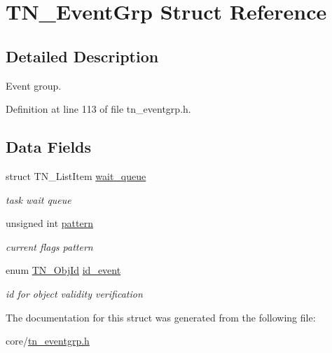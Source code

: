 \hypertarget{structTN__EventGrp}{\section{T\+N\+\_\+\+Event\+Grp Struct Reference}
\label{structTN__EventGrp}
}


\subsection{Detailed Description}
Event group. 

Definition at line 113 of file tn\+\_\+eventgrp.\+h.

\subsection*{Data Fields}
\begin{DoxyCompactItemize}
\item 
\hypertarget{structTN__EventGrp_a93da04331cafe905f9c8b2fa2bad648b}{struct T\+N\+\_\+\+List\+Item \hyperlink{structTN__EventGrp_a93da04331cafe905f9c8b2fa2bad648b}{wait\+\_\+queue}}\label{structTN__EventGrp_a93da04331cafe905f9c8b2fa2bad648b}

\begin{DoxyCompactList}\small\item\em task wait queue \end{DoxyCompactList}\item 
\hypertarget{structTN__EventGrp_a8e287bc47983e2173a5d2696f69b6f2c}{unsigned int \hyperlink{structTN__EventGrp_a8e287bc47983e2173a5d2696f69b6f2c}{pattern}}\label{structTN__EventGrp_a8e287bc47983e2173a5d2696f69b6f2c}

\begin{DoxyCompactList}\small\item\em current flags pattern \end{DoxyCompactList}\item 
\hypertarget{structTN__EventGrp_a0bdf55b6117237122efeefcdf6802d37}{enum \hyperlink{tn__common_8h_ae779dd1f6735f6e139fb70acd004d976}{T\+N\+\_\+\+Obj\+Id} \hyperlink{structTN__EventGrp_a0bdf55b6117237122efeefcdf6802d37}{id\+\_\+event}}\label{structTN__EventGrp_a0bdf55b6117237122efeefcdf6802d37}

\begin{DoxyCompactList}\small\item\em id for object validity verification \end{DoxyCompactList}\end{DoxyCompactItemize}


The documentation for this struct was generated from the following file\+:\begin{DoxyCompactItemize}
\item 
core/\hyperlink{tn__eventgrp_8h}{tn\+\_\+eventgrp.\+h}\end{DoxyCompactItemize}
